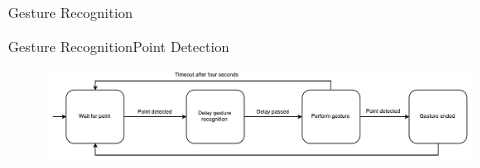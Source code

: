 \begin{frame}{Gesture Recognition}{}
\centering
\begin{figure}
\label{fig:prototype3-gesture-screenshots}
\end{figure}
\end{frame}

\begin{frame}{Gesture Recognition}{Point Detection}
\centering
\begin{figure}
    \includegraphics[width=\textwidth]{../images/point-to-gesture-state-diagram}
\label{fig:point-to-gesture-state-diagram}
\end{figure}
\end{frame}